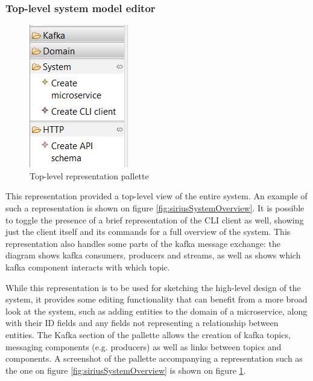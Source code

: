 \documentclass[parskip=full]{article}
\begin{document}
    \subsubsection{Top-level system model editor}
    \begin{figure}
        \hspace{3em}
        \includegraphics[height=0.1\paperheight]{high-level-overview-pallette}
        \caption{Top-level representation pallette}
        \label{fig:topLevelPallette}
    \end{figure}
    This representation provided a top-level view of the entire system.
    An example of such a representation is shown on figure \ref{fig:siriusSystemOverview}.
    It is possible to toggle the presence of a brief representation of the CLI client as well, showing just the client itself and its commands for a full overview of the system.
    This representation also handles some parts of the kafka message exchange: the diagram shows kafka consumers, producers and streams, as well as shows which kafka component interacts with which topic.

    While this representation is to be used for sketching the high-level design of the system, it provides some editing functionality that can benefit from a more broad look at the system, such as adding entities to the domain of a microservice, along with their ID fields and any fields not representing a relationship between entities.
    The Kafka section of the pallette allows the creation of kafka topics, messaging components (e.g. producers) as well as links between topics and components.
    A screenshot of the pallette accompanying a representation such as the one on figure \ref{fig:siriusSystemOverview} is shown on figure \ref{fig:topLevelPallette}.
\end{document}
